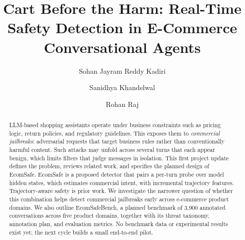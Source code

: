 \documentclass[sigconf,nonacm]{acmart}
\begin{document}
\title{Cart Before the Harm: Real-Time Safety Detection in E-Commerce Conversational Agents}

\author{Sohan Jayram Reddy Kadiri}

\author{Sanidhya Khandelwal}

\author{Rohan Raj}

\renewcommand{\shortauthors}{Kadiri, Khandelwal, and Raj}

\begin{abstract}
LLM-based shopping assistants operate under business constraints such as pricing logic, return policies, and regulatory guidelines. This exposes them to \emph{commercial jailbreaks}: adversarial requests that target business rules rather than conventionally harmful content. Such attacks may unfold across several turns that each appear benign, which limits filters that judge messages in isolation. This first project update defines the problem, reviews related work, and specifies the planned design of EcomSafe. EcomSafe is a proposed detector that pairs a per-turn probe over model hidden states, which estimates commercial intent, with incremental trajectory features. Trajectory-aware safety is prior work. We investigate the narrower question of whether this combination helps detect commercial jailbreaks early across e-commerce product domains. We also outline EcomSafeBench, a planned benchmark of 3,900 annotated conversations across five product domains, together with its threat taxonomy, annotation plan, and evaluation metrics. No benchmark data or experimental results exist yet; the next cycle builds a small end-to-end pilot.
\end{abstract}


\maketitle
\pagestyle{coursereport}
\thispagestyle{coursereport}
\markboth{}{}
\end{document}
